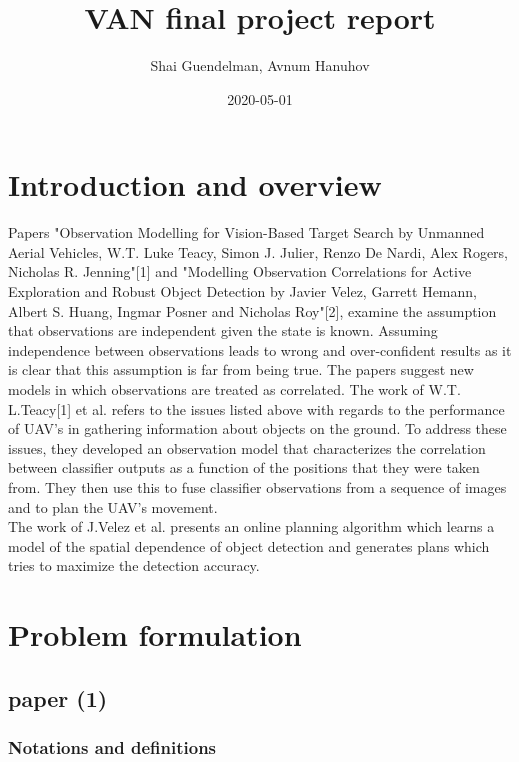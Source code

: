 \documentclass{article}
\title{VAN final project report}
\date{2020-05-01}
\author{Shai Guendelman, Avnum Hanuhov}
\begin{document}
	\maketitle
	\newpage
	
	
	\section{Introduction and overview}
	Papers "Observation Modelling for Vision-Based Target Search by Unmanned Aerial Vehicles, W.T. Luke Teacy, Simon J. Julier, Renzo De Nardi, Alex Rogers, Nicholas R. Jenning"[1] and "Modelling Observation Correlations for Active Exploration and Robust Object Detection by Javier Velez, Garrett Hemann, Albert S. Huang, Ingmar Posner and Nicholas Roy"[2], examine the assumption that observations are independent given the state is known.
	Assuming independence between observations leads to wrong and over-confident results as it is clear that this assumption is far from being true.
	The papers suggest new models in which observations are treated as correlated. 
	The work of W.T. L.Teacy[1] et al. refers to the issues listed above with regards to the performance of UAV's in gathering information about objects on the ground. To address these issues, they developed an observation model that characterizes the correlation between classifier outputs as a function of the positions that they were taken from. They then use this to fuse classifier observations from a sequence of images and to plan the UAV's movement. \\
	The work of J.Velez et al. presents an online planning algorithm which learns a model of the spatial dependence of object detection and generates plans which tries to maximize the detection accuracy.
	
	\section{Problem formulation}
	\subsection{paper (1)}
	
	\subsubsection{Notations and definitions}
	
\end{document}
